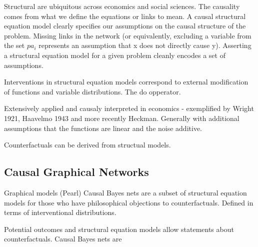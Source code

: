 \documentclass[11pt,a4paper]{article}
\begin{document}


Structural are ubiquitous across economics and social sciences. The causality comes from what we define the equations or links to mean. A causal structural equation model clearly specifies our assumptions on the causal structure of the problem. Missing links in the network (or equivalently, excluding a variable from the set $pa_{i}$ represents an assumption that x does not directly cause y). Asserting a structural equation model for a given problem cleanly encodes a set of assumptions. 

Interventions in structural equation models correspond to external modification of functions and variable distributions. The do opperator.   

Extensively applied and causaly interpreted in economics - exemplified by Wright 1921, Haavelmo 1943 and more recently Heckman. Generally with additional assumptions that the functions are linear and the noise additive. 

Counterfactuals can be derived from structual models.

\subsection*{Causal Graphical Networks}

Graphical models (Pearl)
Causal Bayes nets are a subset of structural equation models for those who have philosophical objections to counterfactuals. 
Defined in terms of interventional distributions. 

Potential outcomes and structural equation models allow statements about counterfactuals. Causal Bayes nets are 
\end{document}
